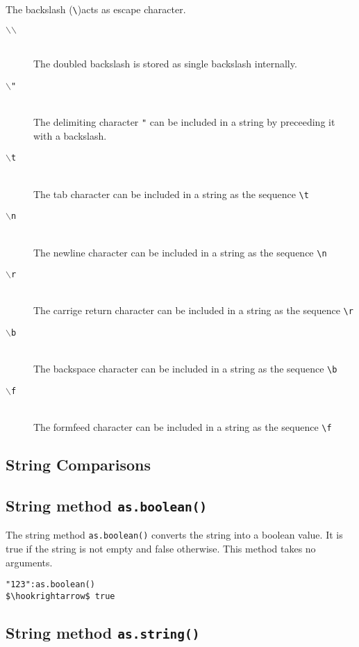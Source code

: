 \documentclass[11pt,a4paper]{scrbook}
\newcommand\BS{\(\backslash\)}
\begin{document}
The backslash (\verb|\|)acts as escape character.
\begin{description}
\item [\tt\BS\BS] \ \\The doubled backslash is stored as single backslash
  internally.
\item [\tt\BS "] \ \\The delimiting character \verb|"| can be included in a
  string by preceeding it with a backslash.
\item [\tt\BS t] \ \\The tab character can be included in a string as the
  sequence \verb|\t|
\item [\tt\BS n] \ \\The newline character can be included in a string as the
  sequence \verb|\n|
\item [\tt\BS r] \ \\The carrige return character can be included in a string as
  the sequence \verb|\r|
\item [\tt\BS b] \ \\The backspace character can be included in a string as the
  sequence \verb|\b|
\item [\tt\BS f] \ \\The formfeed character can be included in a string as the
  sequence \verb|\f|
\end{description}

\subsection{String Comparisons}



\subsection{String method \texttt{as.boolean()}}

The string method \texttt{as.boolean()} converts the string into a boolean
value. It is true if the string is not empty and false otherwise. This method
takes no arguments.

\begin{lstlisting}[language=BibTool,mathescape=true]
"123":as.boolean()
$\hookrightarrow$ true
\end{lstlisting}

\subsection{String method \texttt{as.string()}}
\end{document}

